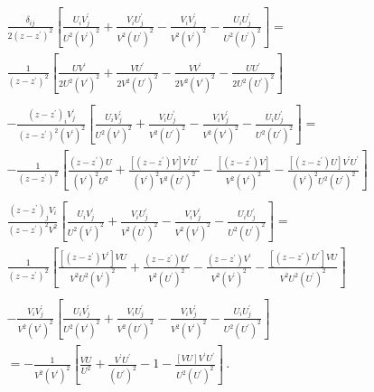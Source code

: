 \documentclass[11pt,a4paper]{article}
\begin{document}
\begin{equation}\begin{split}
&\frac{\delta_{ij}}{2(z-z^{\prime})^{2}}\left[\frac{U_{i}V_{j}^{\prime}}{U^{2}(V^{\prime})^{2}}+\frac{V_{i}U_{j}^{\prime}}{V^{2}(U^{\prime})^{2}}-\frac{V_{i}V_{j}^{\prime}}{V^{2}(V^{\prime})^{2}}-\frac{U_{i}U_{j}^{\prime}}{U^{2}(U^{\prime})^{2}}\right]=\\
&\frac{1}{(z-z^{\prime})^{2}}\left[\frac{UV^{\prime}}{2U^{2}(V^{\prime})^{2}}+\frac{VU^{\prime}}{2V^{2}(U^{\prime})^{2}}-\frac{VV^{\prime}}{2V^{2}(V^{\prime})^{2}}-\frac{UU^{\prime}}{2U^{2}(U^{\prime})^{2}}\right]\\\\
&-\frac{(z-z^{\prime})_{i}V_{j}^{\prime}}{(z-z^{\prime})^{2}(V^{\prime})^{2}}\left[\frac{U_{i}V_{j}^{\prime}}{U^{2}(V^{\prime})^{2}}+\frac{V_{i}U_{j}^{\prime}}{V^{2}(U^{\prime})^{2}}-\frac{V_{i}V_{j}^{\prime}}{V^{2}(V^{\prime})^{2}}-\frac{U_{i}U_{j}^{\prime}}{U^{2}(U^{\prime})^{2}}\right]=\\
&-\frac{1}{(z-z^{\prime})^{2}}\left[\frac{(z-z^{\prime})U}{(V^{\prime})^{2}U^{2}}+\frac{\left[(z-z^{\prime})V\right]V^{\prime}U^{\prime}}{(V^{\prime})^{2}V^{2}(U^{\prime})^{2}}-\frac{\left[(z-z^{\prime})V\right]}{V^{2}(V^{\prime})^{2}}-\frac{\left[(z-z^{\prime})U\right]V^{\prime}U^{\prime}}{(V^{\prime})^{2}U^{2}(U^{\prime})^{2}}\right]\\\\
&\frac{(z-z^{\prime})_{j}V_{i}}{(z-z^{\prime})^{2}V^{2}}\left[\frac{U_{i}V_{j}^{\prime}}{U^{2}(V^{\prime})^{2}}+\frac{V_{i}U_{j}^{\prime}}{V^{2}(U^{\prime})^{2}}-\frac{V_{i}V_{j}^{\prime}}{V^{2}(V^{\prime})^{2}}-\frac{U_{i}U_{j}^{\prime}}{U^{2}(U^{\prime})^{2}}\right]=\\
&\frac{1}{(z-z^{\prime})^{2}}\left[\frac{\left[(z-z^{\prime})V^{\prime}\right]VU}{V^{2}U^{2}(V^{\prime})^{2}}+\frac{(z-z^{\prime})U^{\prime}}{V^{2}(U^{\prime})^{2}}-\frac{(z-z^{\prime})V^{\prime}}{V^{2}(V^{\prime})^{2}}-\frac{\left[(z-z^{\prime})U^{\prime}\right]VU}{V^{2}U^{2}(U^{\prime})^{2}}\right]\\\\
&-\frac{V_{i}V_{j}^{\prime}}{V^{2}(V^{\prime})^{2}}\left[\frac{U_{i}V_{j}^{\prime}}{U^{2}(V^{\prime})^{2}}+\frac{V_{i}U_{j}^{\prime}}{V^{2}(U^{\prime})^{2}}-\frac{V_{i}V_{j}^{\prime}}{V^{2}(V^{\prime})^{2}}-\frac{U_{i}U_{j}^{\prime}}{U^{2}(U^{\prime})^{2}}\right]\\
&=-\frac{1}{V^{2}(V^{\prime})^{2}}\left[\frac{VU}{U^{2}}+\frac{V^{\prime}U^{\prime}}{(U^{\prime})^{2}}-1-\frac{\left[VU\right]V^{\prime}U^{\prime}}{U^{2}(U^{\prime})^{2}}\right]\,. \\
 \end{split}\end{equation}
\end{document}
